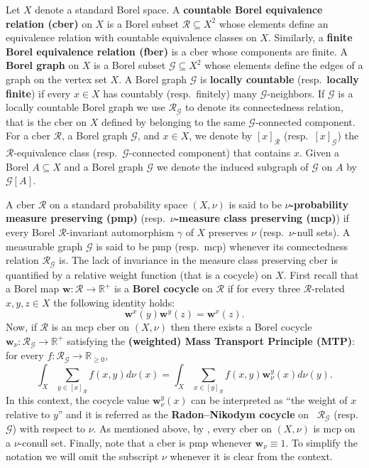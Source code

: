 \documentclass[letterpaper,11pt,reqno]{amsart}
\theoremstyle{bfnote}
\theoremstyle{definition}
\newcommand{\0}{\varnothing}
\newcommand{\R}{\mathbb{R}}
\renewcommand{\geq}{\geqslant}
\newcommand{\w}{\mathbf{w}}
\numberwithin{equation}{section}
\begin{document}
Let $X$ denote a standard Borel space. A \textbf{countable Borel equivalence relation (cber)} on $X$ is a Borel subset $\mathcal{R} \subseteq X^2$ whose elements define an equivalence relation with countable equivalence classes on $X$. 
Similarly, a \textbf{finite Borel equivalence relation (fber)} is a cber whose components are finite. 
A \textbf{Borel graph}  on $X$ is a Borel subset $\mathcal{G} \subseteq X^2$ whose elements define the edges of a graph on the vertex set $X$.  A Borel graph $\mathcal{G}$ is \textbf{locally countable} (resp.\ \textbf{locally finite}) if every $x \in X$ has countably (resp.\ finitely) many $\mathcal{G}$-neighbors. 
If $\mathcal{G}$ is a locally countable Borel graph we use $\mathcal{R}_{\mathcal{G}}$ to denote its connectedness relation, that is the cber on $X$ defined by belonging to the same $\mathcal{G}$-connected component. 
For a cber $\mathcal{R}$, a Borel graph $\mathcal{G}$, and $x\in X$, we denote by $[x]_{\mathcal{R}}$ (resp.\ $[x]_{\mathcal{G}}$) the $\mathcal{R}$-equivalence class (resp.\ $\mathcal{G}$-connected component) that contains $x$. 
Given a Borel $A\subseteq X$ and a Borel graph $\mathcal{G}$ we denote the induced subgraph of $\mathcal{G}$ on $A$ by $\mathcal{G}[A]$. 


A cber $\mathcal{R}$ on a standard probability space $(X,\nu)$ is said to be $\nu$\textbf{-probability measure preserving (pmp)} (resp.\ $\nu$\textbf{-measure class preserving (mcp)}) if every Borel $\mathcal{R}$-invariant automorphism $\gamma$ of $X$ preserves $\nu$ (resp.\ $\nu$-null sets).
A measurable graph $\mathcal{G}$ is said to be pmp (resp.\ mcp) whenever its connectedness relation $\mathcal{R}_{\mathcal{G}}$ is. The lack of invariance in the measure class preserving cber is quantified by a relative weight function (that is a cocycle) on $X$. First recall that a Borel map $\w \colon \mathcal{R} \to \R^+$ is a \textbf{Borel cocycle} on $\mathcal{R}$ if for every three $\mathcal R$-related $x,y,z \in X$ the following identity holds: 
$$
\w^x (y)\w^y (z)  = \w^x (z).
$$
Now, if $\mathcal{R}$ is an mcp cber on $(X,\nu)$ then there exists a Borel cocycle $\w_\nu \colon \mathcal{R}_{\mathcal{G}} \to \mathbb R^+$ satisfying the \textbf{(weighted) Mass Transport Principle (MTP)}: for every $f \colon \mathcal{R}_{\mathcal{G}}\to \mathbb R_{\geq 0}$, 
\begin{equation}\label{mtp}
\int_X \sum_{y\in[x]_{\mathcal{R}}} f(x,y) d\nu (x) = \int_X \sum_{x\in[y]_{\mathcal{R}}} f(x,y) \w_\nu^y (x) d\nu (y).
\end{equation}
In this context, the cocycle value $\w_\nu^y(x)$ can be interpreted as ``the weight of $x$ relative to $y$'' and it is referred as the \textbf{Radon--Nikodym cocycle} on \ $\mathcal{R}_{\mathcal{G}}$ (resp.\ $\mathcal{G}$) with respect to $\nu$. As mentioned above, by \cite[Proposition 2.1]{Miller:thesis}, every cber on $(X,\nu)$ is mcp on a $\nu$-conull set. Finally, note that a cber is pmp whenever $\w_\nu\equiv 1$. To simplify the notation we will omit the subscript $\nu$ whenever it is clear from the context.
\end{document}
